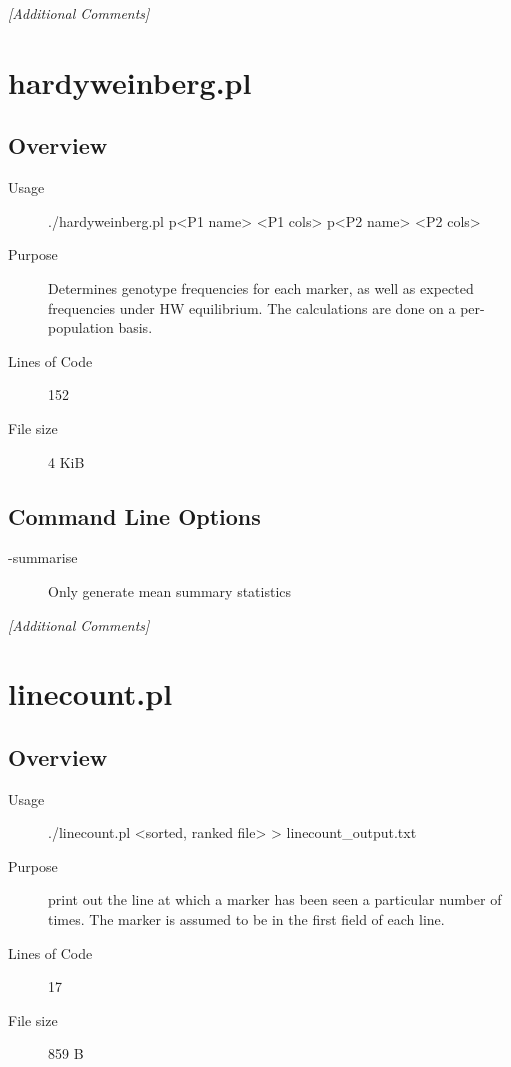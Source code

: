 \emph{[Additional Comments]}

\section{hardyweinberg.pl}
\label{sec:hardyweinberg.pl}

\subsection{Overview}
\label{sec:hardyweinberg.pl-overview}

\begin{description}
\item[Usage] ./hardyweinberg.pl p<P1 name> <P1 cols> p<P2 name> <P2 cols>
\item[Purpose] Determines genotype frequencies for each marker, as well as expected frequencies under HW equilibrium. The calculations are done on a per-population basis.
\item[Lines of Code] 152
\item[File size] 4 KiB
\end{description}

\subsection{Command Line Options}
\label{sec:hardyweinberg.pl-command-line}

\begin{description}
\item[-summarise] Only generate mean summary statistics
\end{description}

\emph{[Additional Comments]}

\section{linecount.pl}
\label{sec:linecount.pl}

\subsection{Overview}
\label{sec:linecount.pl-overview}

\begin{description}
\item[Usage] ./linecount.pl <sorted, ranked file> > linecount_output.txt
\item[Purpose] print out the line at which a marker has been seen a particular number of times. The marker is assumed to be in the first field of each line.
\item[Lines of Code] 17
\item[File size] 859 B
\end{description}


